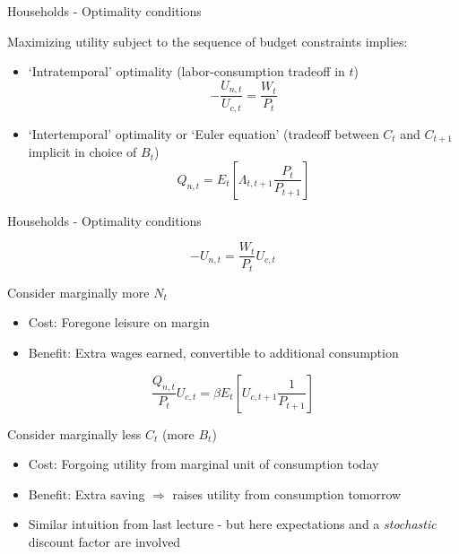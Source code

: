 

\begin{frame}{Households - Optimality conditions}

Maximizing utility subject to the sequence of budget constraints implies:
\vspace{3mm}
\begin{itemize}
\item	`Intratemporal' optimality (labor-consumption tradeoff in $t$)
\[
-\frac{U_{n,t}}{U_{c,t}} = \frac{W_{t}}{P_{t}}
\]
\item	`Intertemporal' optimality or `Euler equation' (tradeoff between $C_{t}$ and $C_{t+1}$ implicit in choice of $B_{t}$)
\[
Q_{n,t}	= E_{t} \left[ \Lambda_{t,t+1} \frac{P_{t}}{P_{t+1}} \right]
\]
\end{itemize}

\end{frame}



\begin{frame}{Households - Optimality conditions}

\[
-U_{n,t} =  \frac{W_{t}}{P_{t}} U_{c,t}
\]

Consider marginally more $N_{t}$
\begin{itemize}
\item 	Cost:	Foregone leisure on margin
\item	Benefit: 	Extra wages earned, convertible to additional consumption
\end{itemize}

\vspace{2mm}
\[
\frac{Q_{n,t}}{P_{t}} U_{c,t} = \beta E_{t} \left[ U_{c,t+1} \frac{1}{P_{t+1}} \right]
\]

Consider marginally less $C_{t}$ (more $B_{t}$)
\begin{itemize}
\item 	Cost:	Forgoing utility from marginal unit of consumption today
\item	Benefit: 	Extra saving $\Rightarrow$ raises utility from consumption tomorrow
\item	Similar intuition from last lecture - but here expectations and a \textit{stochastic} discount factor are involved
\end{itemize}

\end{frame}

